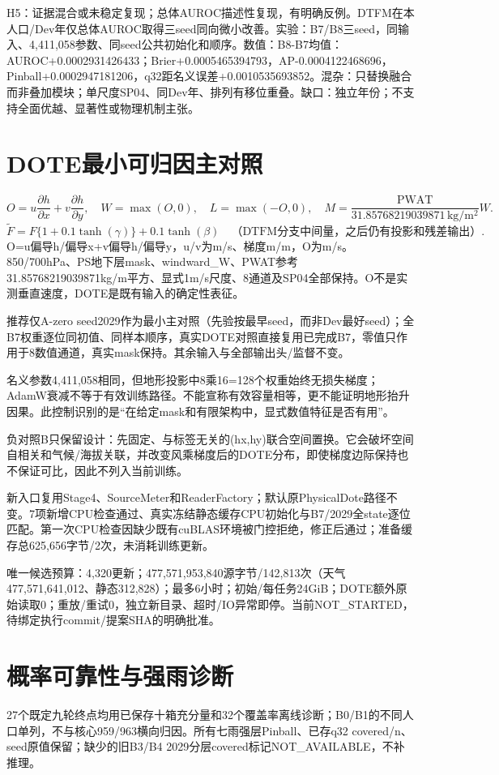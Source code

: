 \documentclass[UTF8,a4paper,10pt,fontset=none]{ctexart}
\begin{document}
H5：证据混合或未稳定复现；总体AUROC描述性复现，有明确反例。DTFM在本人口/Dev年仅总体AUROC取得三seed同向微小改善。实验：B7/B8三seed，同输入、4,\allowbreak{}411,\allowbreak{}058参数、同seed公共初始化和顺序。数值：B8-B7均值：AUROC+0.0002931426433；Brier+0.0005465394793，AP-0.0004122468696，Pinball+0.0002947181206，q32距名义误差+0.0010535693852。混杂：只替换融合而非叠加模块；单尺度SP04、同Dev年、排列有移位重叠。缺口：独立年份；不支持全面优越、显著性或物理机制主张。
\section{DOTE最小可归因主对照}
\[O=u\frac{\partial h}{\partial x}+v\frac{\partial h}{\partial y},\quad W=\max(O,0),\quad L=\max(-O,0),\quad M=\frac{\mathrm{PWAT}}{31.85768219039871\,\mathrm{kg/m^2}}W.\]
\[\widetilde F=F\{1+0.1\tanh(\gamma)\}+0.1\tanh(\beta)\quad\text{（DTFM分支中间量，之后仍有投影和残差输出）}.\]
O=u偏导h/偏导x+v偏导h/偏导y，u/v为m/s、梯度m/m，O为m/s。850/700hPa、PS地下层mask、windward\_W、PWAT参考31.85768219039871kg/m平方、显式1m/s尺度、8通道及SP04全部保持。O不是实测垂直速度，DOTE是既有输入的确定性表征。

推荐仅A-zero seed2029作为最小主对照（先验按最早seed，而非Dev最好seed）；全B7权重逐位同初值、同样本顺序，真实DOTE对照直接复用已完成B7，零值只作用于8数值通道，真实mask保持。其余输入与全部输出头/监督不变。

名义参数4,\allowbreak{}411,\allowbreak{}058相同，但地形投影中8乘16=128个权重始终无损失梯度；AdamW衰减不等于有效训练路径。不能宣称有效容量相等，更不能证明地形抬升因果。此控制识别的是“在给定mask和有限架构中，显式数值特征是否有用”。

负对照B只保留设计：先固定、与标签无关的(hx,\allowbreak{}hy)联合空间置换。它会破坏空间自相关和气候/海拔关联，并改变风乘梯度后的DOTE分布，即使梯度边际保持也不保证可比，因此不列入当前训练。

新入口复用Stage4、SourceMeter和ReaderFactory；默认原PhysicalDote路径不变。7项新增CPU检查通过、真实冻结静态缓存CPU初始化与B7/2029全state逐位匹配。第一次CPU检查因缺少既有cuBLAS环境被门控拒绝，修正后通过；准备缓存总625,\allowbreak{}656字节/2次，未消耗训练更新。

唯一候选预算：4,\allowbreak{}320更新；477,\allowbreak{}571,\allowbreak{}953,\allowbreak{}840源字节/142,\allowbreak{}813次（天气477,\allowbreak{}571,\allowbreak{}641,\allowbreak{}012、静态312,\allowbreak{}828）；最多6小时；初始/每任务24GiB；DOTE额外原始读取0；重放/重试0，独立新目录、超时/IO异常即停。当前NOT\_STARTED，待绑定执行commit/提案SHA的明确批准。
\section{概率可靠性与强雨诊断}
27个既定九轮终点均用已保存十箱充分量和32个覆盖率离线诊断；B0/B1的不同人口单列，不与核心959/963横向归因。所有七雨强层Pinball、已存q32 covered/n、seed原值保留；缺少的旧B3/B4 2029分层covered标记NOT\_AVAILABLE，不补推理。
\end{document}
